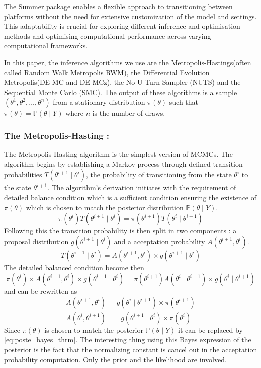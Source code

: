 \documentclass[nonatbib,preprint,12pt,authoryear]{elsarticle}
\begin{document}
The Summer package enables a flexible approach to transitioning between platforms without the need for extensive customization of the model and settings. This adaptability is crucial for exploring different inference and optimisation methods and optimising computational performance across varying computational frameworks. 

In this paper, the inference algorithms we use are the Metropolis-Hastings(often called Random Walk Metropolis RWM), the Differential Evolution Metropolis(DE-MC and DE-MCz), the No-U-Turn Sampler (NUTS) and the Sequential Monte Carlo (SMC). 
The output of these algorithms is a sample $(\theta^1, \theta^2, \ldots, \theta^n)$ from a stationary distribution $\pi(\theta)$ such that $\pi(\theta) = \mathbb{P}(\theta \mid Y)$ where $n$ is the number of draws. 

\subsubsection{The Metropolis-Hasting :}The Metropolis-Hasting algorithm is the simplest version of MCMCs. The algorithm begins by establishing a Markov process through defined transition probabilities $T(\theta^{i+1} \mid \theta^i)$, the probability of transitioning from the state $\theta^i$ to the state $\theta^{i+1}$. The algorithm's derivation initiates with the requirement of detailed balance condition which is a sufficient condition ensuring the existence of $\pi(\theta)$ \cite{padmanabhan_ranjan_2022_Markov_Chain} which is chosen to match the posterior distribution $\mathbb{P}(\theta \mid Y)$.
\begin{equation}
    \label{eq:Detailed_Balanced_Condition}
    \pi(\theta^i) T(\theta^{i+1} \mid \theta^i) = \pi(\theta^{i+1}) T(\theta^i \mid \theta^{i+1})
\end{equation}
Following this the transition probability is then split in two components : a proposal distribution $g(\theta^{i+1} \mid \theta^i)$ and a acceptation probability $A(\theta^{i+1},\theta^i)$.
$$T(\theta^{i+1} \mid \theta^i) = A(\theta^{i+1},\theta^i) \times g(\theta^{i+1} \mid \theta^i) $$
The detailed balanced condition become then
$$ \pi(\theta^i) \times A(\theta^{i+1},\theta^i) \times g(\theta^{i+1} \mid \theta^i) = \pi(\theta^{i+1}) A(\theta^i \mid \theta^{i+1}) \times g(\theta^i \mid \theta^{i+1}) $$ and can be rewritten as
$$\dfrac{A(\theta^{i+1},\theta^i)}{A(\theta^i,\theta^{i+1})}= \dfrac{g(\theta^i \mid \theta^{i+1}) \times \pi(\theta^{i+1})}{g(\theta^{i+1} \mid \theta^i) \times \pi(\theta^i)}$$
Since $\pi(\theta)$ is chosen to match the posterior $\mathbb{P}(\theta \mid Y) $ it can be replaced by \ref{eq:poste_bayes_thrm}. The interesting thing using this Bayes expression of the posterior is the fact that the normalizing constant is cancel out in the acceptation probability computation. Only the prior and the likelihood are involved.
\end{document}
